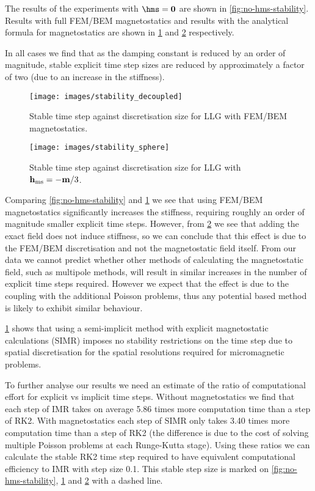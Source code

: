 The results of the experiments with $\hms = \zerov$ are shown in \cref{fig:no-hms-stability}.
Results with full FEM/BEM magnetostatics and results with the analytical formula for magnetostatics are shown in \cref{fig:hms-stability} and \ref{fig:analytic-hms-stability} respectively. 

In all cases we find that as the damping constant is reduced by an order of magnitude, stable explicit time step sizes are reduced by approximately a factor of two (due to an increase in the stiffness).

\begin{figure}
  \centering
  \texttt{[image: images/stability\_decoupled]}
  \caption{Stable time step against discretisation size for LLG with FEM/BEM magnetostatics.}
  \label{fig:hms-stability}
\end{figure}


\begin{figure}
  \centering
  \texttt{[image: images/stability\_sphere]}
  \caption{Stable time step against discretisation size for LLG with $\mathbf{h}_{\text{ms}} = - \mathbf{m} / 3$.
  }
  \label{fig:analytic-hms-stability}
\end{figure}

Comparing \cref{fig:no-hms-stability} and \ref{fig:hms-stability} we see that using FEM/BEM magnetostatics significantly increases the stiffness, requiring roughly an order of magnitude smaller explicit time steps.
However, from \cref{fig:analytic-hms-stability} we see that adding the exact field does not induce stiffness, so we can conclude that this effect is due to the FEM/BEM discretisation and not the magnetostatic field itself.
From our data we cannot predict whether other methods of calculating the magnetostatic field, such as multipole methods, will result in similar increases in the number of explicit time steps required.
However we expect that the effect is due to the coupling with the additional Poisson problems, thus any potential based method is likely to exhibit similar behaviour.

\cref{fig:hms-stability} shows that using a semi-implicit method with explicit magnetostatic calculations (SIMR) imposes no stability restrictions on the time step due to spatial discretisation for the spatial resolutions required for micromagnetic problems.

To further analyse our results we need an estimate of the ratio of computational effort for explicit vs implicit time steps. Without magnetostatics we find that each step of IMR takes on average 5.86 times more computation time than a step of RK2. With magnetostatics each step of SIMR only takes 3.40 times more computation time than a step of RK2 (the difference is due to the cost of solving multiple Poisson problems at each Runge-Kutta stage). Using these ratios we can calculate the stable RK2 time step required to have equivalent computational efficiency to IMR with step size 0.1. This stable step size is marked on \cref{fig:no-hms-stability}, \ref{fig:hms-stability} and \ref{fig:analytic-hms-stability} with a dashed line.

